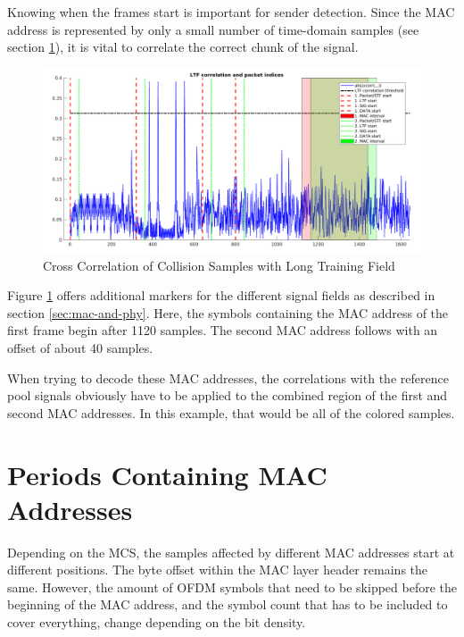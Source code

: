 Knowing when the frames start is important for sender detection. Since the \gls{MAC} address is represented by only a small number of time-domain samples (see section \ref{sec:mac-periods}), it is vital to correlate the correct chunk of the signal.

\begin{figure}[H]
	\centering
	\includegraphics[width=\textwidth]{gfx/plots/preamble}
	\caption{Cross Correlation of Collision Samples with Long Training Field}
	\label{fig:preamble-corr}
\end{figure}

Figure \ref{fig:preamble-corr} offers additional markers for the different signal fields as described in section \ref{sec:mac-and-phy}. Here, the symbols containing the \gls{MAC} address of the first frame begin after 1120 samples. The second \gls{MAC} address follows with an offset of about 40 samples.

When trying to decode these \gls{MAC} addresses, the correlations with the reference pool signals obviously have to be applied to the combined region of the first and second \gls{MAC} addresses. In this example, that would be all of the colored samples.



\section{Periods Containing MAC Addresses}\label{sec:mac-periods}

Depending on the \gls{MCS}, the samples affected by different \gls{MAC} addresses start at different positions. The byte offset within the \gls{MAC} layer header remains the same. However, the amount of \gls{OFDM} symbols that need to be skipped before the beginning of the \gls{MAC} address, and the symbol count that has to be included to cover everything, change depending on the bit density.

